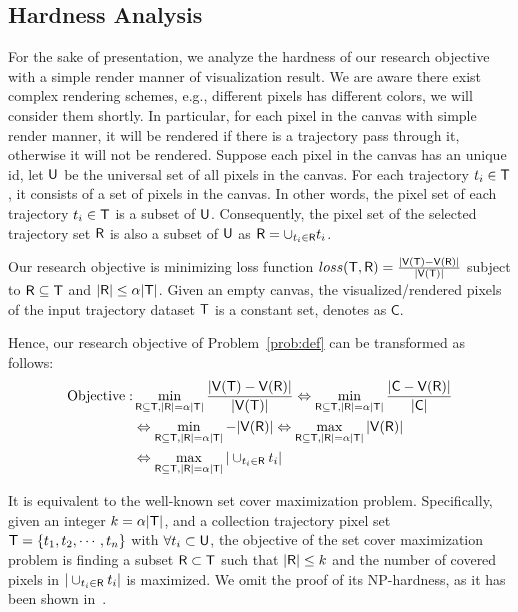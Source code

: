 \subsection{Hardness Analysis}\label{sec:hard}
For the sake of presentation, we analyze the hardness of our research objective with a simple render manner of visualization result.
We are aware there exist complex rendering schemes, e.g., different pixels has different colors, we will consider them shortly.
In particular, for each pixel in the canvas with simple render manner, it will be rendered if there is a trajectory pass through it, otherwise it will not be rendered.
Suppose each pixel in the canvas has an unique id, let $\mathsf{U}$ be the universal set of all pixels in the canvas.
For each trajectory $t_i \in \mathsf{T}$, it consists of a set of pixels in the canvas.
In other words, the pixel set of each trajectory $t_i \in \mathsf{T}$ is a subset of $\mathsf{U}$.
Consequently, the pixel set of the selected trajectory set $\mathsf{R}$ is also a subset of $\mathsf{U}$ as $\mathsf{R} = \cup_{t_i \in \mathsf{R}} t_i$.


Our research objective is minimizing loss function $loss(\mathsf{T}, \mathsf{R}) =  \frac{|\mathsf{V}(\mathsf{T}) - \mathsf{V}(\mathsf{R})|}{|\mathsf{V}(\mathsf{T})|}$ subject to $\mathsf{R} \subseteq \mathsf{T}$ and $|\mathsf{R}| \leq \alpha |\mathsf{T}|$.
Given an empty canvas, the visualized/rendered pixels of the input trajectory dataset $\mathsf{T}$ is a constant set, denotes as $\mathsf{C}$.

Hence, our research objective of Problem~\ref{prob:def} can be transformed as follows:
\begin{align}\label{eqn:obj2} \nonumber
\text{Objective}: & \min_{\oR \subseteq \D, |\oR| = \alpha |\D|}  \frac{|\V(\D) - \V(\oR)|}{|\V(\D)|} \Leftrightarrow \min_{\oR \subseteq \D, |\oR| = \alpha |\D|}  \frac{|\mathsf{C} - \V(\oR)|}{|\mathsf{C}|}  \\ \nonumber %
& \Leftrightarrow \min_{\oR \subseteq \D, |\oR| = \alpha |\D|}   - |\V(\oR)| \Leftrightarrow \max_{\oR \subseteq \D, |\oR| = \alpha |\D|}  |\V(\oR)|  \\ \nonumber
& \Leftrightarrow \max_{\oR \subseteq \D, |\oR| = \alpha |\D|} | \cup_{t_i \in \oR} t_i |
\end{align}

It is equivalent to the well-known set cover maximization problem.
Specifically, given an integer $k = \alpha |\mathsf{T}|$, and a collection trajectory pixel set $\mathsf{T} = \{t_1, t_2, \cdots, t_n \}$ with $\forall t_i \subset \mathsf{U}$,
the objective of the set cover maximization problem is finding a subset $\mathsf{R} \subset \mathsf{T}$ such that $|\mathsf{R}| \leq k$ and the number of covered pixels in $|\cup_{t_i \in \mathsf{R}} t_i|$ is maximized.
We omit the proof of its NP-hardness, as it has been shown in~\cite{setcover}.


